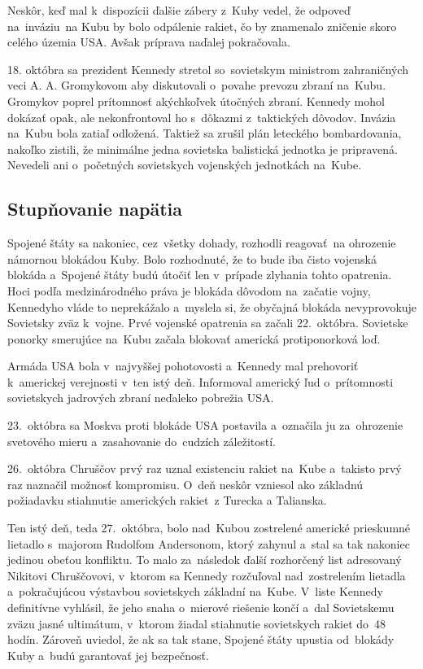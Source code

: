 \documentclass[a4paper]{article}
\begin{document}
Neskôr, keď mal k~dispozícii ďalšie zábery z~Kuby vedel, že odpoveď na~inváziu~na Kubu by bolo odpálenie rakiet, čo by znamenalo zničenie skoro celého územia USA. Avšak príprava naďalej pokračovala.

18. októbra sa prezident Kennedy stretol so~sovietskym ministrom zahraničných veci A. A. Gromykovom aby diskutovali o~povahe prevozu zbraní na~Kubu. Gromykov poprel prítomnosť akýchkoľvek útočných zbraní. Kennedy mohol dokázať opak, ale nekonfrontoval ho s~dôkazmi z~taktických dôvodov. Invázia na~Kubu bola zatiaľ odložená. Taktiež sa zrušil plán leteckého bombardovania, nakoľko zistili, že minimálne jedna sovietska balistická jednotka je pripravená. Nevedeli ani o~početných sovietskych vojenských jednotkách na~Kube.

\subsection{Stupňovanie napätia}
Spojené štáty sa nakoniec, cez~všetky dohady, rozhodli reagovať~na ohrozenie námornou blokádou Kuby. Bolo rozhodnuté, že to bude iba čisto vojenská blokáda a~Spojené štáty budú útočiť len v~prípade zlyhania tohto opatrenia. Hoci podľa medzinárodného práva je blokáda dôvodom na~začatie vojny, Kennedyho vláde to neprekážalo a~myslela si, že obyčajná blokáda nevyprovokuje Sovietsky zväz k~vojne. Prvé vojenské opatrenia sa začali 22.~októbra. Sovietske ponorky smerujúce na~Kubu začala blokovať americká protiponorková loď.

Armáda USA bola v~najvyššej pohotovosti a~Kennedy mal prehovoriť k~americkej verejnosti v~ten istý deň. Informoval americký ľud o~prítomnosti sovietskych jadrových zbraní neďaleko pobrežia USA.

23.~októbra sa Moskva proti blokáde USA postavila a~označila ju za~ohrozenie svetového mieru a~zasahovanie do~cudzích záležitostí.

26.~októbra Chruščov prvý raz uznal existenciu rakiet na~Kube a~takisto prvý raz naznačil možnosť kompromisu. O~deň neskôr vzniesol ako základnú požiadavku stiahnutie amerických rakiet~z Turecka a Talianska. 

Ten istý deň, teda 27.~októbra, bolo nad~Kubou zostrelené americké prieskumné lietadlo s~majorom Rudolfom Andersonom, ktorý zahynul a~stal sa tak nakoniec jedinou obeťou konfliktu. To malo za~následok ďalší rozhorčený list adresovaný Nikitovi Chruščovovi, v~ktorom sa Kennedy rozčuľoval nad~zostrelením lietadla a~pokračujúcou výstavbou sovietskych základní na~Kube. V~liste Kennedy definitívne vyhlásil, že jeho snaha o~mierové riešenie končí a~dal Sovietskemu zväzu jasné ultimátum, v~ktorom žiadal stiahnutie sovietskych rakiet do~48 hodín. Zároveň uviedol, že ak sa tak stane, Spojené štáty upustia od~blokády Kuby a~budú garantovať jej bezpečnosť.
\end{document}
